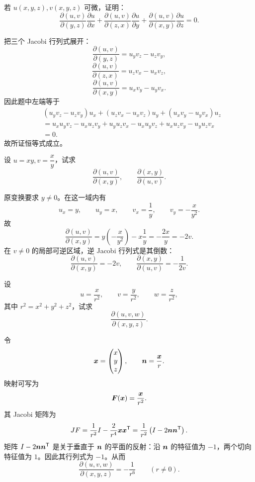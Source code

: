 \begin{xexercise}[11]
若 $u(x,y,z),v(x,y,z)$ 可微，证明：
  \[
    \frac{\partial(u,v)}{\partial(y,z)}\frac{\partial u}{\partial x}
    +\frac{\partial(u,v)}{\partial(z,x)}\frac{\partial u}{\partial y}
    +\frac{\partial(u,v)}{\partial(x,y)}\frac{\partial u}{\partial z}=0.
  \]
\end{xexercise}
\begin{xsolution}
把三个 Jacobi 行列式展开：
\[
  \frac{\partial(u,v)}{\partial(y,z)}=u_yv_z-u_zv_y,
\]
\[
  \frac{\partial(u,v)}{\partial(z,x)}=u_zv_x-u_xv_z,
\]
\[
  \frac{\partial(u,v)}{\partial(x,y)}=u_xv_y-u_yv_x.
\]
因此题中左端等于
\begin{align*}
 &(u_yv_z-u_zv_y)u_x
 +(u_zv_x-u_xv_z)u_y
 +(u_xv_y-u_yv_x)u_z\\
 &=u_xu_yv_z-u_xu_zv_y
   +u_yu_zv_x-u_xu_yv_z
   +u_xu_zv_y-u_yu_zv_x\\
 &=0.
\end{align*}
故所证恒等式成立。
\end{xsolution}


\begin{xexercise}[12]
设 $u=xy,v=\dfrac xy$，试求
  \[
    \frac{\partial(u,v)}{\partial(x,y)},\qquad
    \frac{\partial(x,y)}{\partial(u,v)}.
  \]
\end{xexercise}
\begin{xsolution}
原变换要求 $y\ne0$。在这一域内有
\[
  u_x=y,
  \qquad u_y=x,
  \qquad
  v_x=\frac1y,
  \qquad v_y=-\frac{x}{y^2}.
\]
故
\[
  \frac{\partial(u,v)}{\partial(x,y)}
  =y\left(-\frac{x}{y^2}\right)-x\frac1y
  =-\frac{2x}{y}=-2v.
\]
在 $v\ne0$ 的局部可逆区域，逆 Jacobi 行列式是其倒数：
\[
  \boxed{\displaystyle
    \frac{\partial(u,v)}{\partial(x,y)}=-2v,
    \qquad
    \frac{\partial(x,y)}{\partial(u,v)}=-\frac1{2v}}.
\]
\end{xsolution}


\begin{xexercise}[13]
设
  \[
    u=\frac{x}{r^2},\qquad v=\frac{y}{r^2},\qquad w=\frac{z}{r^2},
  \]
  其中 $r^2=x^2+y^2+z^2$，试求
  \[
    \frac{\partial(u,v,w)}{\partial(x,y,z)}.
  \]
\end{xexercise}
\begin{xsolution}
令
\[
  \bm{x}=\begin{pmatrix}x\\y\\z\end{pmatrix},
  \qquad
  \bm{n}=\frac{\bm{x}}r.
\]
映射可写为
\[
  \bm{F}(\bm{x})=\frac{\bm{x}}{r^2}.
\]
其 Jacobi 矩阵为
\[
  JF=\frac1{r^2}I-\frac2{r^4}\bm{x}\bm{x}^{\mathsf T}
  =\frac1{r^2}\left(I-2\bm{n}\bm{n}^{\mathsf T}\right).
\]
矩阵 $I-2\bm{n}\bm{n}^{\mathsf T}$ 是关于垂直于 $\bm{n}$ 的平面的反射：沿 $\bm{n}$ 的特征值为 $-1$，两个切向特征值为 $1$。因此其行列式为 $-1$。从而
\[
  \boxed{\displaystyle
    \frac{\partial(u,v,w)}{\partial(x,y,z)}
    =-\frac1{r^6}}
  \qquad(r\ne0).
\]
\end{xsolution}


